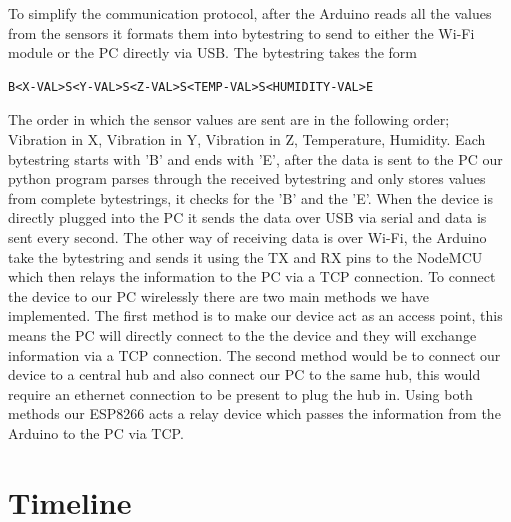 \documentclass[12pt, titlepage]{article}
\begin{document}
To simplify the communication protocol, after the Arduino reads all the values from the sensors it formats them into bytestring to send to either the Wi-Fi module or the PC directly via USB. The bytestring takes the form

\begin{verbatim}
B<X-VAL>S<Y-VAL>S<Z-VAL>S<TEMP-VAL>S<HUMIDITY-VAL>E
\end{verbatim}

The order in which the sensor values are sent are in the following order; Vibration in X, Vibration in Y, Vibration in Z, Temperature, Humidity. Each bytestring starts with 'B' and ends with 'E', after the data is sent to the PC our python program parses through the received bytestring and only stores values from complete bytestrings, it checks for the 'B' and the 'E'. When the device is directly plugged into the PC it sends the data over USB via serial and data is sent every second. The other way of receiving data is over Wi-Fi, the Arduino take the bytestring and sends it using the TX and RX pins to the NodeMCU which then relays the information to the PC via a TCP connection.
\newline
\newline
To connect the device to our PC wirelessly there are two main methods we have implemented. The first method is to make our device act as an access point, this means the PC will directly connect to the the device and they will exchange information via a TCP connection. The second method would be to connect our device to a central hub and also connect our PC to the same hub, this would require an ethernet connection to be present to plug the hub in. Using both methods our ESP8266 acts a relay device which passes the information from the Arduino to the PC via TCP.


\newpage
\section{Timeline}
\end{document}
